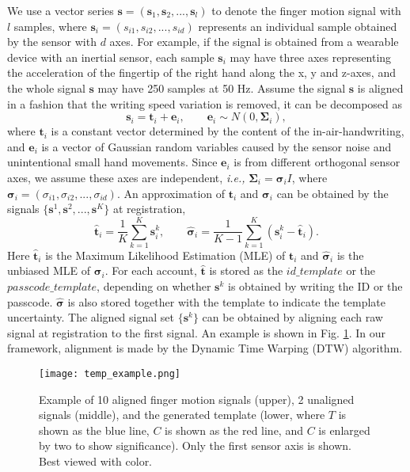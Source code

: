 \documentclass[conference]{IEEEtran}
\begin{document}
We use a vector series $\mathbf{s} = (\mathbf{s}_1, \mathbf{s}_2, ..., \mathbf{s}_l)$ to denote the finger motion signal with $l$ samples, where $\mathbf{s}_i = (s_{i1}, s_{i2}, ..., s_{id})$ represents an individual sample obtained by the sensor with $d$ axes. For example, if the signal is obtained from a wearable device with an inertial sensor, each sample $\mathbf{s}_i$ may have three axes representing the acceleration of the fingertip of the right hand along the x, y and z-axes, and the whole signal $\mathbf{s}$ may have 250 samples at 50 Hz. Assume the signal $\mathbf{s}$ is aligned in a fashion that the writing speed variation is removed, it can be decomposed as 
$$\mathbf{s}_i = \mathbf{t}_i + \mathbf{e}_i, \quad\quad \mathbf{e}_i \sim N(0, \mathbf{\Sigma}_i),$$
\noindent where $\mathbf{t}_i$ is a constant vector determined by the content of the in-air-handwriting, and $\mathbf{e}_i$ is a vector of Gaussian random variables caused by the sensor noise and unintentional small hand movements. Since $\mathbf{e}_i$ is from different orthogonal sensor axes, we assume these axes are independent, \textit{i.e.,} $\mathbf{\Sigma}_i = \boldsymbol{\sigma}_i I$, where $\boldsymbol{\sigma}_i = (\sigma_{i1}, \sigma_{i2}, ..., \sigma_{id})$. An approximation of $\mathbf{t}_i$ and $\boldsymbol{\sigma}_i$ can be obtained by the signals $\{\mathbf{s}^1, \mathbf{s}^2, ..., \mathbf{s}^K\}$ at registration, 
$$\hat{\mathbf{t}}_i = \frac{1}{K} \sum_{k=1}^K\mathbf{s}_i^k, \quad\quad \hat{\boldsymbol{\sigma}}_i = \frac{1}{K-1}\sum_{k=1}^K(\mathbf{s}_i^k - \hat{\mathbf{t}}_i).$$
Here $\hat{\mathbf{t}}_i$ is the Maximum Likelihood Estimation (MLE) of $\mathbf{t}_i$ and $\hat{\boldsymbol{\sigma}}_i$ is the unbiased MLE of $\boldsymbol{\sigma}_i$. For each account, $\hat{\mathbf{t}}$ is stored as the $id\_template$ or the $passcode\_template$, depending on whether $\mathbf{s}^k$ is obtained by writing the ID or the passcode. $\hat{\boldsymbol{\sigma}}$ is also stored together with the template to indicate the template uncertainty. The aligned signal set $\{\mathbf{s}^k\}$ can be obtained by aligning each raw signal at registration to the first signal. An example is shown in Fig. \ref{fig:temp_example}. In our framework, alignment is made by the Dynamic Time Warping (DTW) algorithm.


\begin{figure}
\centering
\texttt{[image: temp\_example.png]}
\caption{Example of 10 aligned finger motion signals (upper), 2 unaligned signals (middle), and the generated template (lower, where $T$ is shown as the blue line, $C$ is shown as the red line, and $C$ is enlarged by two to show significance). Only the first sensor axis is shown. Best viewed with color.}
\label{fig:temp_example}
\end{figure}
\end{document}
